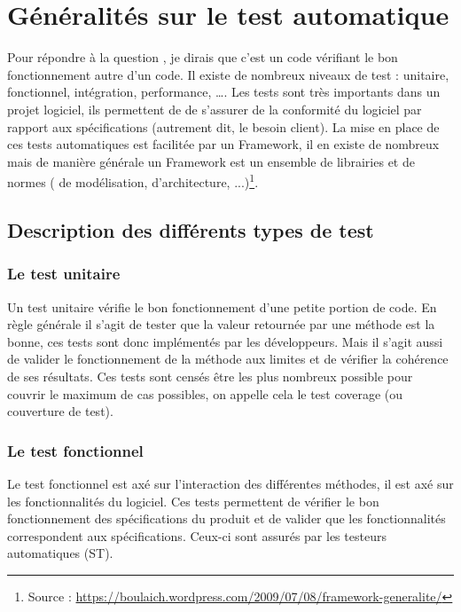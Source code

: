
\section{G\'{e}n\'{e}ralit\'{e}s sur le test automatique}

Pour r\'{e}pondre \`{a} la question , je dirais que c'est un code v\'{e}rifiant le bon fonctionnement autre d'un code. Il existe de nombreux niveaux de test : unitaire, fonctionnel, int\'{e}gration, performance, \ldots. Les tests sont tr\`{e}s importants dans un projet logiciel, ils permettent de de s'assurer de la conformit\'{e} du logiciel par rapport aux sp\'{e}cifications (autrement dit, le besoin client). La mise en place de ces tests automatiques est facilit\'{e}e par un Framework, il en existe de nombreux mais de mani\`{e}re g\'{e}n\'{e}rale un Framework est un ensemble de librairies et de normes ( de mod\'{e}lisation, d'architecture, ...)\footnote{Source : \url{https://boulaich.wordpress.com/2009/07/08/framework-generalite/}}. \\
\subsection{Description des diff\'{e}rents types de test}



\subsubsection{Le test unitaire}
Un test unitaire v\'{e}rifie le bon fonctionnement d'une petite portion de code. En r\`{e}gle g\'{e}n\'{e}rale il s'agit de tester que la valeur retourn\'{e}e par une m\'{e}thode est la bonne, ces tests sont donc impl\'{e}ment\'{e}s par les d\'{e}veloppeurs. Mais il s'agit aussi de valider le fonctionnement de la m\'{e}thode aux limites et de v\'{e}rifier la coh\'{e}rence de ses r\'{e}sultats. Ces tests sont cens\'{e}s \^{e}tre les plus nombreux possible pour couvrir le maximum de cas possibles, on appelle cela le test coverage (ou couverture de test).

\subsubsection{Le test fonctionnel}
Le test fonctionnel est ax\'{e} sur l'interaction des diff\'{e}rentes m\'{e}thodes, il est ax\'{e} sur les fonctionnalit\'{e}s du logiciel. Ces tests permettent de v\'{e}rifier le bon fonctionnement des sp\'{e}cifications du produit et de valider que les fonctionnalit\'{e}s correspondent aux sp\'{e}cifications. Ceux-ci sont assur\'{e}s par les testeurs automatiques (ST).

